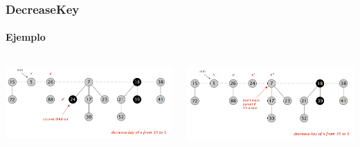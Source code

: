 \documentclass{beamer}
\begin{document}
\begin{frame}
  \frametitle{DecreaseKey}
  \framesubtitle{Ejemplo}
   
     \begin{columns}[t]
    \centering
    \includegraphics[width =1 \textwidth]{img/decrease/09.png} 
      
    \centering
    \includegraphics[width =1 \textwidth]{img/decrease/10.png} 

   \end{columns}
   
\end{frame}
\end{document}
